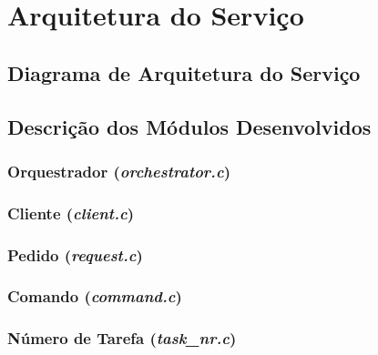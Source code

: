 \documentclass[a4paper,11pt]{scrreprt}
\begin{document}
\renewcommand{\contentsname}{Índice}
\renewcommand{\listfigurename}{Índice de Figuras}

\tableofcontents

\pagebreak

\listoffigures

\pagebreak

%




\chapter{Arquitetura do Serviço}
    \section{Diagrama de Arquitetura do Serviço}
    \section{Descrição dos Módulos Desenvolvidos}
        \subsection{Orquestrador (\textit{orchestrator.c})}
        \subsection{Cliente (\textit{client.c})}
        \subsection{Pedido (\textit{request.c})}
        \subsection{Comando (\textit{command.c})}
        \subsection{Número de Tarefa (\textit{task\_nr.c})}
\end{document}
